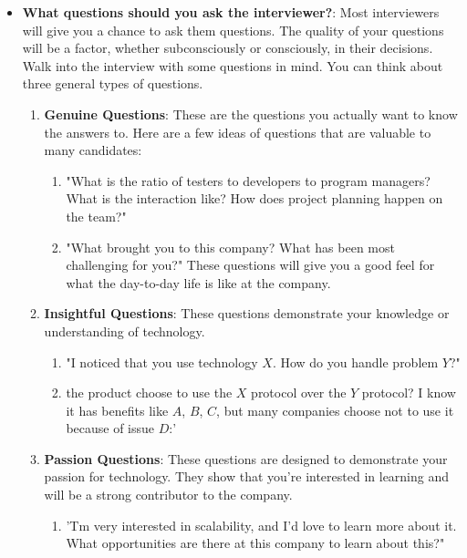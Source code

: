 \documentclass{report}
\begin{document}
\begin{itemize}
\begin{center}
            \end{center}
        \item \textbf{What questions should you ask the interviewer?}: Most interviewers will give you a chance to ask them questions. The quality of your questions will be a factor, whether subconsciously or consciously, in their decisions. Walk into the interview with some questions in mind. 
            \bigbreak \noindent 
            You can think about three general types of questions.
            \begin{enumerate}
                \item \textbf{Genuine Questions}: These are the questions you actually want to know the answers to. Here are a few ideas of questions that are valuable to many candidates:
                    \begin{enumerate}[label=(\alph*)]
                        \item "What is the ratio of testers to developers to program managers? What is the interaction like? How does project planning happen on the team?"
                        \item "What brought you to this company? What has been most challenging for you?" These questions will give you a good feel for what the day-to-day life is like at the company. 
                    \end{enumerate}
                \item \textbf{Insightful Questions}: These questions demonstrate your knowledge or understanding of technology. 
                    \begin{enumerate}[label=(\alph*)]
                        \item "I noticed that you use technology $X$. How do you handle problem $Y$?"
                        \item the product choose to use the $X$ protocol over the $Y$ protocol? I know it has benefits like $A$, $B$, $C$, but many companies choose not to use it because of issue $D$:'
                    \end{enumerate}
                \item \textbf{Passion Questions}: These questions are designed to demonstrate your passion for technology. They show that you're interested in learning and will be a strong contributor to the company.
                    \begin{enumerate}
                        \item 'Tm very interested in scalability, and I'd love to learn more about it. What opportunities are there at this company to learn about this?"

\end{enumerate}
\end{enumerate}
\end{itemize}
\end{document}
